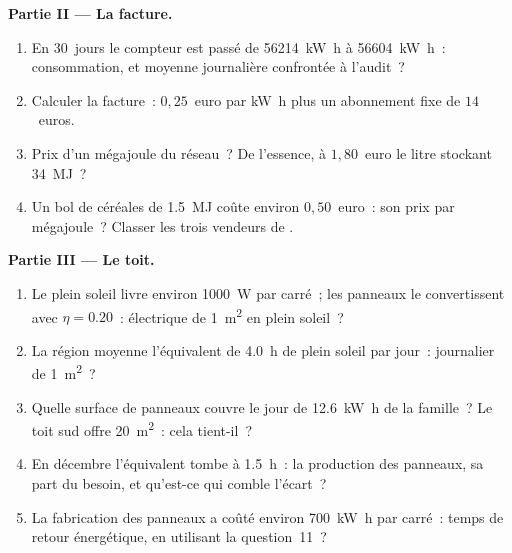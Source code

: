 \begin{problem}
\medskip
\noindent\textbf{Partie II --- La facture.}
\begin{enumerate}[resume]
  \item En $30$~jours le compteur est passé de \qty{56214}{kW.h} à
        \qty{56604}{kW.h}~: consommation, et moyenne journalière
        confrontée à l'audit~?
  \item Calculer la facture~: $0{,}25$~euro par \unit{kW.h} plus un
        abonnement fixe de $14$~euros.
  \item Prix d'un mégajoule du réseau~? De l'essence, à $1{,}80$~euro
        le litre stockant \qty{34}{MJ}~?
  \item Un bol de céréales de \qty{1.5}{MJ} coûte environ
        $0{,}50$~euro~: son prix par mégajoule~? Classer les trois
        vendeurs de .
\end{enumerate}

\medskip
\noindent\textbf{Partie III --- Le toit.}
\begin{enumerate}[resume]
  \item Le plein soleil livre environ \qty{1000}{W} par
         carré~; les panneaux le convertissent
        avec $\eta = 0.20$~:  électrique de
        \qty{1}{m^2} en plein soleil~?
  \item La région moyenne l'équivalent de \qty{4.0}{h} de plein soleil
        par jour~:  journalier de \qty{1}{m^2}~?
  \item Quelle surface de panneaux couvre le jour de
        \qty{12.6}{kW.h} de la famille~? Le toit sud offre
        \qty{20}{m^2}~: cela tient-il~?
  \item En décembre l'équivalent tombe à \qty{1.5}{h}~: la production
        des panneaux, sa part du besoin, et qu'est-ce qui comble
        l'écart~?
  \item La fabrication des panneaux a coûté environ \qty{700}{kW.h} par
         carré~: temps de retour énergétique, en
        utilisant la question~11~?
\end{enumerate}


\end{problem}
